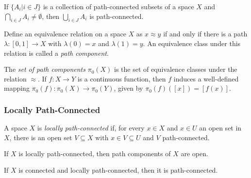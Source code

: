 \begin{lemma}
If $\{ A_i | i \in J \}$ is a collection of path-connected subsets of a space $X$ and $\bigcap_{i \in J}A_i \neq \emptyset$, then
$\bigcup_{i \in J}A_i$ is path-connected.
\end{lemma}

\label{pathcomponent}
Define an equivalence relation on a space $X$ as $x \approx y$ if and only if there is a path $\lambda:[0,1] \rightarrow X$ with $\lambda(0) = x$ and $\lambda(1) = y$.
An equivalence class under this relation is called a \emph{path component}.\newline

\noindent The \emph{set of path components}\label{setofpathcomponents} $\pi_0 (X)$ is the set of equivalence classes under the relation $\approx$. If $f : X \rightarrow Y$ is a continuous function,
then $f$ induces a well-defined mapping $\pi_0(f) : \pi_0(X) \rightarrow \pi_0(Y)$, given by $\pi_0(f)([x]) = [f(x)]$.

\subsubsection{Locally Path-Connected}\label{locallypathconnected}
A space $X$ is \emph{locally path-connected} if, for every $x \in X$ and $x \in U$ an open set in $X$, there is an open set $V \subseteq X$ with $x \in V \subseteq U$
and $V$ path-connected.

\begin{proposition}
If $X$ is locally path-connected, then path components of $X$ are open.
\end{proposition}

\begin{corollary}
If $X$ is connected and locally path-connected, then it is path-connected.
\end{corollary}